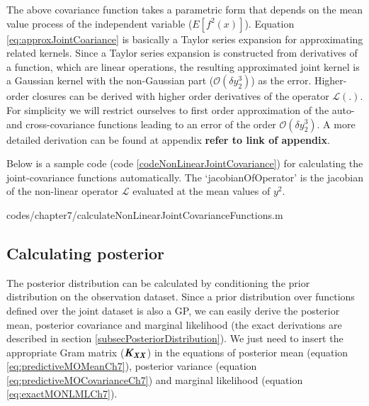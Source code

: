 The above covariance function takes a parametric form that depends on the mean value process of the independent variable ($E[f^2(x)]$). Equation \ref{eq:approxJointCoariance} is basically a Taylor series expansion for approximating related kernels. Since a Taylor series expansion is constructed from derivatives of a function, which are linear operations, the resulting approximated joint kernel is a Gaussian kernel with the non-Gaussian part ($\mathcal{O}\left ( \delta y_{2}^{3} \right )$) as the error. Higher-order closures can be derived with higher order derivatives of the operator \(\mathcal{L}(.)\). For simplicity we will restrict ourselves to first order approximation of the auto- and cross-covariance functions leading to an error of the order \(\mathcal{O}\left ( \delta y_{2}^{3} \right )\).  A more detailed derivation can be found at appendix \textbf{refer to link of appendix}. 

Below is a sample code (code \ref{codeNonLinearJointCovariance}) for calculating the joint-covariance functions automatically. The `jacobianOfOperator' is the jacobian of the non-linear operator $\mathcal{L}$ evaluated at the mean values of $y^2$.

\begin{mdframed}[hidealllines=true,backgroundcolor=lightgray!20]
            {codes/chapter7/calculateNonLinearJointCovarianceFunctions.m}
\end{mdframed}

\subsection{Calculating posterior}\label{sub:MOGPs}
The posterior distribution can be calculated by conditioning the prior distribution on the observation dataset. Since a prior distribution over functions defined over the joint dataset is also a GP, we can easily derive the posterior mean, posterior covariance and marginal likelihood (the exact derivations are described in section \ref{subsecPosteriorDistribution}). We just need to insert the appropriate Gram matrix ($\bm{\mathit{K_{XX}}}$) in the equations of posterior mean (equation \ref{eq:predictiveMOMeanCh7}), posterior variance (equation \ref{eq:predictiveMOCovarianceCh7}) and marginal likelihood (equation \ref{eq:exactMONLMLCh7}). 

